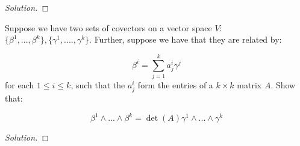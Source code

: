 \documentclass[10pt]{article}
\newenvironment{problem}[2][]{\begin{trivlist}
\item[\hskip \labelsep {\bfseries #1}\hskip \labelsep {\bfseries #2.}]}{\end{trivlist}}
\begin{document}
\begin{proof}[Solution]


\end{proof}

\begin{problem}{Question 7}

Suppose we have two sets of covectors on a vector space $V$: $\{ \beta^1,...,\beta^k \}, \{ \gamma^1,....,\gamma^k \}$. Further, suppose we have that they are related by:

$$ \beta^i  = \sum_{j=1}^k a_j^i \gamma^j$$ for each $1 \leq i \leq k$, such that the $a_j^i$ form the entries of a $k\times k$ matrix $A$. Show that:

$$ \beta^1 \wedge ... \wedge \beta^k = \det(A) \gamma^1 \wedge ... \wedge \gamma^k$$

\end{problem}

\begin{proof}[Solution]


\end{proof}
\end{document}
